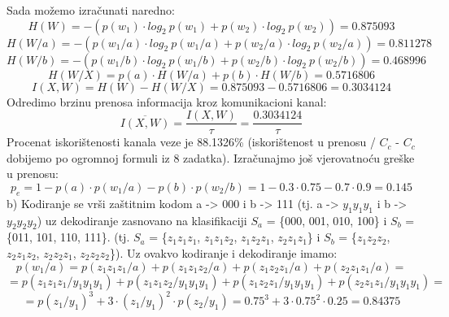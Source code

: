 \documentclass[12pt]{article}
\begin{document}
\begin{enumerate}
Sada možemo izračunati naredno: \\
\begin{equation*}
    H(W) = -(p(w_1) \cdot log_2~p(w_1) + p(w_2) \cdot log_2~p(w_2)) = 0.875093
\end{equation*}
\begin{equation*}
    H(W/a) = -(p(w_1/a) \cdot log_2~p(w_1/a) + p(w_2/a) \cdot log_2~p(w_2/a)) = 0.811278
\end{equation*}
\begin{equation*}
    H(W/b) = -(p(w_1/b) \cdot log_2~p(w_1/b) + p(w_2/b) \cdot log_2~p(w_2/b)) = 0.468996
\end{equation*}
\begin{equation*}
    H(W/X) = p(a) \cdot H(W/a) + p(b) \cdot H(W/b) = 0.5716806
\end{equation*}
\begin{equation*}
    I(X,W) = H(W) - H(W/X) = 0.875093 - 0.5716806 = 0.3034124
\end{equation*}
Odredimo brzinu prenosa informacija kroz komunikacioni kanal:
\begin{equation*}
        \overline{I(X,W)} = \frac{I(X,W)}{\tau} = \frac{0.3034124}{\tau}
\end{equation*}
Procenat iskorištenosti kanala veze je 88.1326\% (iskorištenost u prenosu / $C_c$ - $C_c$ dobijemo po ogromnoj formuli iz 8 zadatka). Izračunajmo još
vjerovatnoću greške u prenosu: 
\begin{equation*}
    p_e = 1 - p(a) \cdot p(w_1/a) - p(b) \cdot p(w_2/b) = 1 - 0.3 \cdot 0.75 - 0.7 \cdot 0.9 = 0.145
\end{equation*}
\newpage
b) Kodiranje se vrši zaštitnim kodom a -> 000 i b -> 111 (tj. a ->
$y_1y_1y_1$ i b -> $y_2y_2y_2$) uz dekodiranje zasnovano na klasifikaciji $S_a$ =
\{000, 001, 010, 100\} i $S_b$ = \{011, 101, 110, 111\}.
(tj. $S_a$ = \{$z_1z_1z_1$, $z_1z_1z_2$, $z_1z_2z_1$, $z_2z_1z_1$\} i $S_b$ = \{$z_1z_2z_2$, $z_2z_1z_2$, $z_2z_2z_1$, $z_2z_2z_2$\}).
Uz ovakvo kodiranje i dekodiranje imamo: \\
\begin{equation*}
    p(w_1/a) = p(z_1z_1z_1/a) + p(z_1z_1z_2/a) + p(z_1z_2z_1/a) + p(z_2z_1z_1/a) = 
\end{equation*}
\begin{equation*}
    = p(z_1z_1z_1/y_1y_1y_1) + p(z_1z_1z_2/y_1y_1y_1) + p(z_1z_2z_1/y_1y_1y_1) + p(z_2z_1z_1/y_1y_1y_1) = 
\end{equation*}
\begin{equation*}
    = p(z_1/y_1)^3 + 3 \cdot (z_1/y_1)^2 \cdot p(z_2/y_1) = 0.75^3 + 3 \cdot 0.75^2 \cdot 0.25 = 0.84375

\end{equation*}
\end{enumerate}
\end{document}
